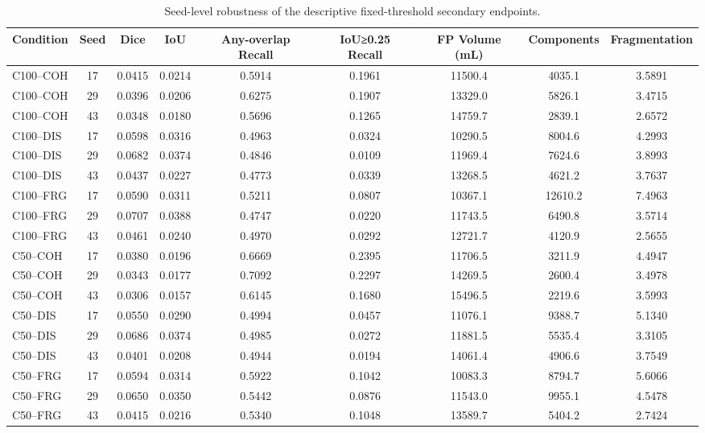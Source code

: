 \begin{table}[t]
\centering
\small
\caption{Seed-level robustness of the descriptive fixed-threshold secondary endpoints.}
\label{tab:cova_seed_robustness}
\begin{tabular}{lcccccccc}
\toprule
Condition & Seed & Dice & IoU & Any-overlap Recall & IoU≥0.25 Recall & FP Volume (mL) & Components & Fragmentation \\
\midrule
C100–COH & 17 & 0.0415 & 0.0214 & 0.5914 & 0.1961 & 11500.4 & 4035.1 & 3.5891 \\
C100–COH & 29 & 0.0396 & 0.0206 & 0.6275 & 0.1907 & 13329.0 & 5826.1 & 3.4715 \\
C100–COH & 43 & 0.0348 & 0.0180 & 0.5696 & 0.1265 & 14759.7 & 2839.1 & 2.6572 \\
C100–DIS & 17 & 0.0598 & 0.0316 & 0.4963 & 0.0324 & 10290.5 & 8004.6 & 4.2993 \\
C100–DIS & 29 & 0.0682 & 0.0374 & 0.4846 & 0.0109 & 11969.4 & 7624.6 & 3.8993 \\
C100–DIS & 43 & 0.0437 & 0.0227 & 0.4773 & 0.0339 & 13268.5 & 4621.2 & 3.7637 \\
C100–FRG & 17 & 0.0590 & 0.0311 & 0.5211 & 0.0807 & 10367.1 & 12610.2 & 7.4963 \\
C100–FRG & 29 & 0.0707 & 0.0388 & 0.4747 & 0.0220 & 11743.5 & 6490.8 & 3.5714 \\
C100–FRG & 43 & 0.0461 & 0.0240 & 0.4970 & 0.0292 & 12721.7 & 4120.9 & 2.5655 \\
C50–COH & 17 & 0.0380 & 0.0196 & 0.6669 & 0.2395 & 11706.5 & 3211.9 & 4.4947 \\
C50–COH & 29 & 0.0343 & 0.0177 & 0.7092 & 0.2297 & 14269.5 & 2600.4 & 3.4978 \\
C50–COH & 43 & 0.0306 & 0.0157 & 0.6145 & 0.1680 & 15496.5 & 2219.6 & 3.5993 \\
C50–DIS & 17 & 0.0550 & 0.0290 & 0.4994 & 0.0457 & 11076.1 & 9388.7 & 5.1340 \\
C50–DIS & 29 & 0.0686 & 0.0374 & 0.4985 & 0.0272 & 11881.5 & 5535.4 & 3.3105 \\
C50–DIS & 43 & 0.0401 & 0.0208 & 0.4944 & 0.0194 & 14061.4 & 4906.6 & 3.7549 \\
C50–FRG & 17 & 0.0594 & 0.0314 & 0.5922 & 0.1042 & 10083.3 & 8794.7 & 5.6066 \\
C50–FRG & 29 & 0.0650 & 0.0350 & 0.5442 & 0.0876 & 11543.0 & 9955.1 & 4.5478 \\
C50–FRG & 43 & 0.0415 & 0.0216 & 0.5340 & 0.1048 & 13589.7 & 5404.2 & 2.7424 \\
\bottomrule
\end{tabular}
\end{table}
